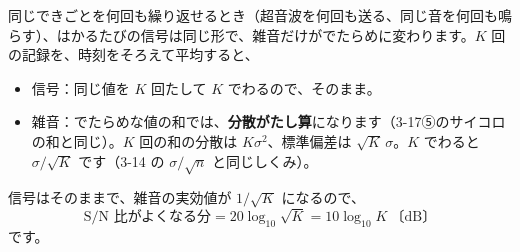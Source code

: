 同じできごとを何回も繰り返せるとき（超音波を何回も送る、同じ音を何回も鳴らす）、はかるたびの信号は同じ形で、雑音だけがでたらめに変わります。$K$ 回の記録を、時刻をそろえて平均すると、
\begin{itemize}[leftmargin=1.2\zw, itemsep=1pt, topsep=2pt, label={\color{bkTheme}●}]
\item 信号：同じ値を $K$ 回たして $K$ でわるので、そのまま。
\item 雑音：でたらめな値の和では、\textbf{分散がたし算}になります（3-17⑤のサイコロの和と同じ）。$K$ 回の和の分散は $K\sigma^2$、標準偏差は $\sqrt K\,\sigma$。$K$ でわると $\sigma/\sqrt K$ です（3-14 の $\sigma/\sqrt n$ と同じしくみ）。
\end{itemize}
信号はそのままで、雑音の実効値が $1/\sqrt K$ になるので、
\[\text{S/N 比がよくなる分}=20\log_{10}\sqrt K=10\log_{10}K\ \text{〔dB〕}\]
です。

